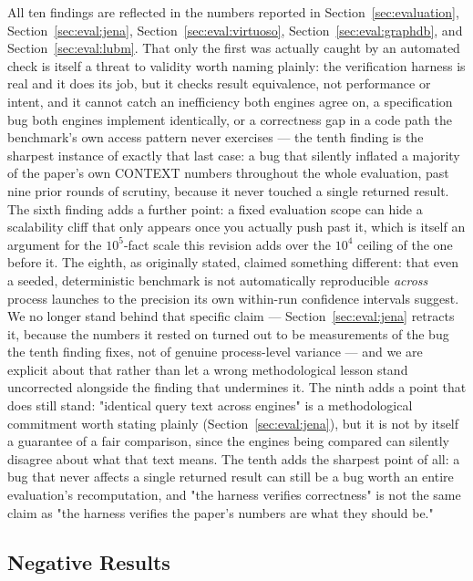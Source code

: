 All ten findings are reflected in the numbers reported in
Section~\ref{sec:evaluation}, Section~\ref{sec:eval:jena},
Section~\ref{sec:eval:virtuoso}, Section~\ref{sec:eval:graphdb}, and
Section~\ref{sec:eval:lubm}. That only the first was actually caught by
an automated check is itself a threat to validity worth naming plainly:
the verification harness is real and it does its job, but it checks
result equivalence, not performance or intent, and it cannot catch
an inefficiency both engines agree on, a specification bug
both engines implement identically, or a correctness gap in a code path
the benchmark's own access pattern never exercises --- the tenth finding
is the sharpest instance of exactly that last case: a bug that silently
inflated a majority of the paper's own CONTEXT numbers throughout the
whole evaluation, past nine prior rounds of scrutiny, because it never
touched a single returned result. The sixth finding adds a
further point: a fixed evaluation scope can hide a scalability cliff that
only appears once you actually push past it, which is itself an argument
for the $10^5$-fact scale this revision adds over the $10^4$ ceiling of
the one before it. The eighth, as originally stated, claimed something
different: that even a seeded, deterministic benchmark is not
automatically reproducible \emph{across} process launches to the
precision its own within-run confidence intervals suggest. We no longer
stand behind that specific claim --- Section~\ref{sec:eval:jena} retracts
it, because the numbers it rested on turned out to be measurements of
the bug the tenth finding fixes, not of genuine process-level variance
--- and we are explicit about that rather than let a wrong methodological
lesson stand uncorrected alongside the finding that undermines it. The
ninth
adds a point that does still stand: "identical query text across
engines" is a methodological
commitment worth stating plainly (Section~\ref{sec:eval:jena}), but it
is not by itself a guarantee of a fair comparison, since the engines
being compared can silently disagree about what that text means. The
tenth adds the sharpest point of all: a bug that never affects a single
returned result can still be a bug worth an entire evaluation's
recomputation, and "the harness verifies correctness" is not the same
claim as "the harness verifies the paper's numbers are what they should
be."

\subsection{Negative Results}
\label{sec:discussion:negative}

